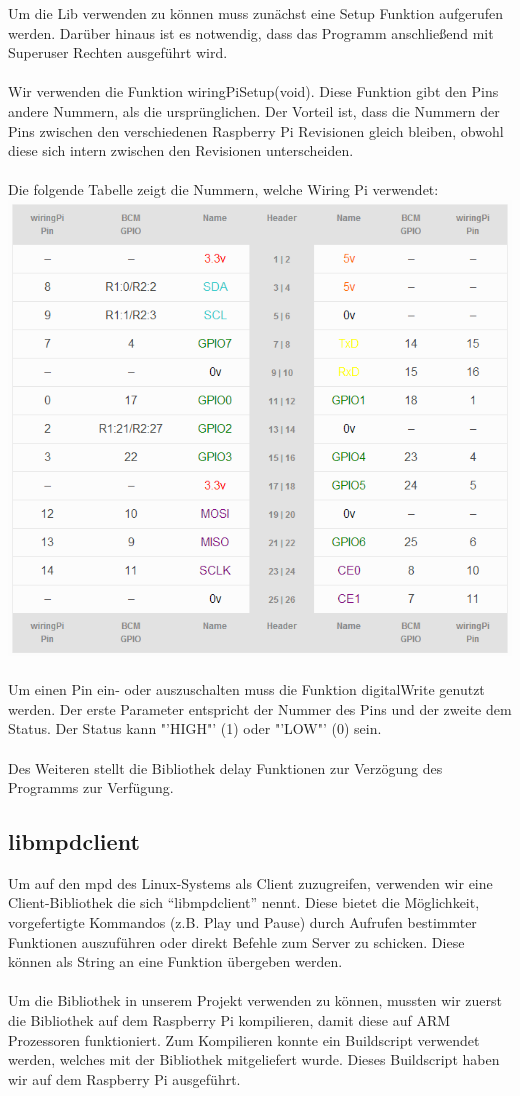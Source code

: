 Um die Lib verwenden zu können muss zunächst eine Setup Funktion aufgerufen werden. Darüber hinaus ist es notwendig, dass das Programm anschließend mit Superuser Rechten ausgeführt wird.\\
\\
Wir verwenden die Funktion wiringPiSetup(void). Diese Funktion gibt den Pins andere Nummern, als die ursprünglichen. Der Vorteil ist, dass die Nummern der Pins zwischen den verschiedenen Raspberry Pi Revisionen gleich bleiben, obwohl diese sich intern zwischen den Revisionen unterscheiden.\\
\\
Die folgende Tabelle zeigt die Nummern, welche Wiring Pi verwendet:\\
\includegraphics{GPIO_Pins.PNG}\\
\\
Um einen Pin ein- oder auszuschalten muss die Funktion digitalWrite genutzt werden. Der erste Parameter entspricht der Nummer des Pins und der zweite dem Status. Der Status kann "'HIGH"' (1) oder "'LOW"' (0) sein.\\
\\
Des Weiteren stellt die Bibliothek delay Funktionen zur Verzögung des Programms zur Verfügung.

\subsection{libmpdclient}
Um auf den mpd des Linux-Systems als Client zuzugreifen, verwenden wir eine Client-Bibliothek die sich "`libmpdclient"' nennt. Diese bietet die Möglichkeit, vorgefertigte Kommandos (z.B. Play und Pause) durch Aufrufen bestimmter Funktionen auszuführen oder direkt Befehle zum Server zu schicken. Diese können als String an eine Funktion übergeben werden.\\\\
Um die Bibliothek in unserem Projekt verwenden zu können, mussten wir zuerst die Bibliothek auf dem Raspberry Pi kompilieren, damit diese auf ARM Prozessoren funktioniert. Zum Kompilieren konnte ein Buildscript verwendet werden, welches mit der Bibliothek mitgeliefert wurde. Dieses Buildscript haben wir auf dem Raspberry Pi ausgeführt.
